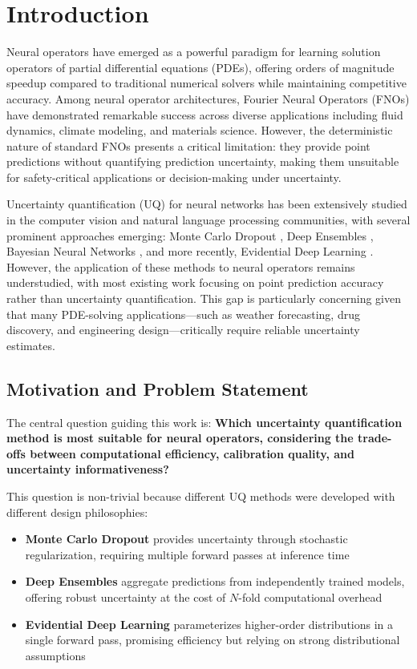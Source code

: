 \section{Introduction}

Neural operators have emerged as a powerful paradigm for learning solution operators of partial differential 
equations (PDEs), offering orders of magnitude speedup compared to traditional numerical solvers while maintaining 
competitive accuracy. Among neural operator architectures, Fourier Neural Operators (FNOs) \cite{li2020fourier} 
have demonstrated remarkable success across diverse applications including fluid dynamics, climate modeling, and 
materials science. However, the deterministic nature of standard FNOs presents a critical limitation: they 
provide point predictions without quantifying prediction uncertainty, making them unsuitable for safety-critical 
applications or decision-making under uncertainty.

Uncertainty quantification (UQ) for neural networks has been extensively studied in the computer vision and natural 
language processing communities, with several prominent approaches emerging: Monte Carlo 
Dropout \cite{gal2016dropout}, Deep Ensembles \cite{lakshminarayanan2017simple}, Bayesian Neural Networks 
\cite{blundell2015weight}, and more recently, Evidential Deep Learning \cite{sensoy2018evidential,amini2020deep}. 
However, the application of these methods to neural operators remains understudied, with most existing work 
focusing on point prediction accuracy rather than uncertainty quantification. This gap is particularly concerning 
given that many PDE-solving applications—such as weather forecasting, drug discovery, and engineering 
design—critically require reliable uncertainty estimates.

\subsection{Motivation and Problem Statement}

The central question guiding this work is: \textbf{Which uncertainty quantification method is most suitable for neural operators, considering the trade-offs between computational efficiency, calibration quality, and uncertainty informativeness?}

This question is non-trivial because different UQ methods were developed with different design philosophies:
\begin{itemize}
    \item \textbf{Monte Carlo Dropout} provides uncertainty through stochastic regularization, requiring multiple forward passes at inference time
    \item \textbf{Deep Ensembles} aggregate predictions from independently trained models, offering robust uncertainty at the cost of $N$-fold computational overhead
    \item \textbf{Evidential Deep Learning} parameterizes higher-order distributions in a single forward pass, promising efficiency but relying on strong distributional assumptions
\end{itemize}

